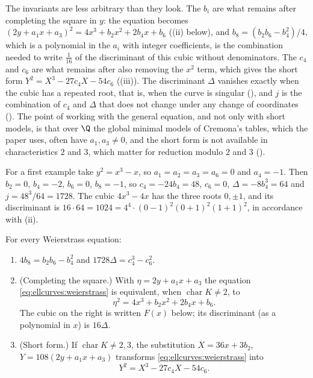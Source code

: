 The invariants are less arbitrary than they look. The $b_i$ are what remains after completing the square in $y$: the equation becomes
$(2y+a_1x+a_3)^2=4x^3+b_2x^2+2b_4x+b_6$ ((ii) below), and $b_8=(b_2b_6-b_4^2)/4$, which is a polynomial in the $a_i$ with integer coefficients,
is the combination needed to write $\frac1{16}$ of the discriminant of this cubic without denominators. The $c_4$ and $c_6$ are what remains after also removing the $x^2$ term, which gives the short form
$Y^2=X^3-27c_4X-54c_6$ ((iii)). The discriminant $\Delta$ vanishes exactly when the cubic has a repeated root, that is, when the curve is
singular (), and $j$ is the combination of $c_4$ and $\Delta$ that does not change under any change of coordinates
(). The point of working with the general equation, and not only with short models, is that over $\Q$ the global minimal models of
Cremona's tables, which the paper uses, often have $a_1,a_3\ne0$, and the short form is not available in characteristics $2$ and $3$, which matter for reduction
modulo $2$ and $3$ ().

For a first example take $y^2=x^3-x$, so $a_1=a_2=a_3=a_6=0$ and $a_4=-1$. Then $b_2=0$, $b_4=-2$, $b_6=0$, $b_8=-1$, so $c_4=-24b_4=48$, $c_6=0$,
$\Delta=-8b_4^3=64$ and $j=48^3/64=1728$. The cubic $4x^3-4x$ has the three roots $0,\pm1$, and its discriminant is $16\cdot64=1024=4^4\cdot(0-1)^2(0+1)^2(1+1)^2$,
in accordance with (ii).

\begin{lemma}[identities]\label{lem:ellcurves:identities}
For every Weierstrass equation:
\begin{enumerate}[label=(\roman*)]
\item $4b_8=b_2b_6-b_4^2$ and $1728\Delta=c_4^3-c_6^2$.
\item (Completing the square.) With $\eta=2y+a_1x+a_3$ the equation \eqref{eq:ellcurves:weierstrass} is equivalent, when $\operatorname{char}K\ne2$, to
\[
\eta^2=4x^3+b_2x^2+2b_4x+b_6 .
\]
The cubic on the right is written $F(x)$ below; its discriminant (as a polynomial in $x$) is $16\Delta$.
\item (Short form.) If $\operatorname{char}K\ne2,3$, the substitution $X=36x+3b_2$, $Y=108(2y+a_1x+a_3)$ transforms \eqref{eq:ellcurves:weierstrass} into
\[
Y^2=X^3-27c_4X-54c_6 .
\]
\end{enumerate}
\end{lemma}

